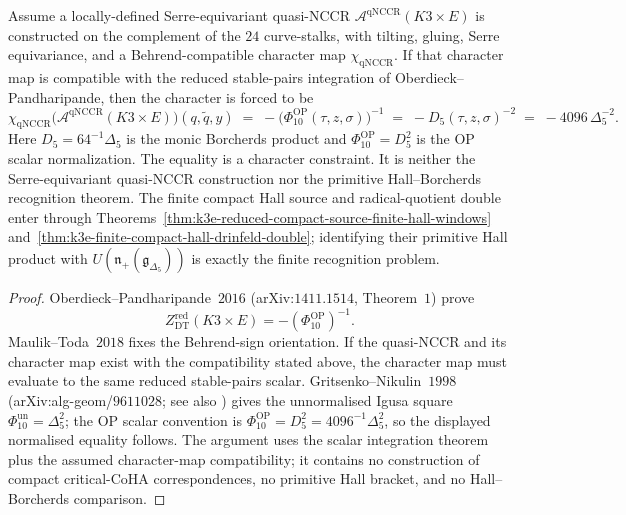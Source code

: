 \begin{theorem}
\label{thm:quasi-nccr-character-phi10}
Assume a locally-defined Serre-equivariant quasi-NCCR
\(\mathcal{A}^{\mathrm{qNCCR}}(K3 \times E)\) is constructed on the
complement of the \(24\) curve-stalks, with tilting, gluing, Serre
equivariance, and a Behrend-compatible character map
\(\chi_{\mathrm{qNCCR}}\). If that character map is compatible with
the reduced stable-pairs integration of Oberdieck--Pandharipande, then
the character is forced to be
\[
 \chi_{\mathrm{qNCCR}}\bigl(\mathcal{A}^{\mathrm{qNCCR}}(K3 \times E)\bigr)(q,\tilde q,y)
 \;=\;
 -\bigl(\Phi_{10}^{\mathrm{OP}}(\tau,z,\sigma)\bigr)^{-1}
 \;=\;
 -D_5(\tau,z,\sigma)^{-2}
 \;=\;
 -4096\,\Delta_5^{-2}.
\]
Here \(D_5=64^{-1}\Delta_5\) is the monic Borcherds product and
\(\Phi_{10}^{\mathrm{OP}}=D_5^2\) is the OP scalar normalization.
The equality is a character constraint. It is neither the
Serre-equivariant quasi-NCCR construction nor the primitive
Hall--Borcherds recognition theorem. The finite compact Hall source and
radical-quotient double enter through
Theorems~\ref{thm:k3e-reduced-compact-source-finite-hall-windows}
and~\ref{thm:k3e-finite-compact-hall-drinfeld-double}; identifying
their primitive Hall product with
\(U(\mathfrak n_+(\mathfrak g_{\Delta_5}))\) is exactly the finite
recognition problem.
\end{theorem}

\begin{proof}
Oberdieck--Pandharipande~$2016$ (arXiv:$1411.1514$, Theorem~$1$)
prove
\[
 Z^{\mathrm{red}}_{\mathrm{DT}}(K3 \times E)
 =
 -(\Phi_{10}^{\mathrm{OP}})^{-1}.
\]
Maulik--Toda~$2018$ fixes the Behrend-sign orientation. If the
quasi-NCCR and its character map exist with the compatibility stated
above, the character map must evaluate to the same reduced
stable-pairs scalar. Gritsenko--Nikulin~$1998$
(arXiv:alg-geom/$9611028$; see also \cite{GritsenkoNikulin1998})
gives the unnormalised Igusa square
\(\Phi_{10}^{\mathrm{un}}=\Delta_5^2\); the OP scalar convention is
\(\Phi_{10}^{\mathrm{OP}}=D_5^2=4096^{-1}\Delta_5^2\), so the displayed
normalised equality follows. The
argument uses the scalar integration theorem plus the assumed
character-map compatibility; it contains no construction of compact
critical-CoHA correspondences, no primitive Hall bracket, and no
Hall--Borcherds comparison.
\end{proof}


